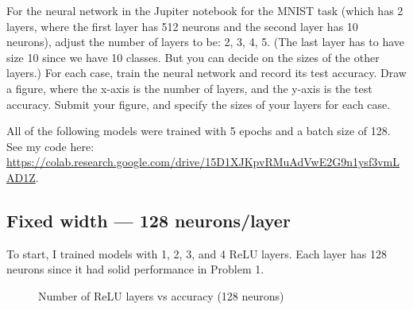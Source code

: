 \documentclass[11pt]{article}
\begin{document}
\pagebreak
\begin{homeworkProblem}
    \setcounter{section}{2}
    For the neural network in the Jupiter notebook for the MNIST task (which has 2 layers, where the first layer has 512 neurons and the second layer has 10 neurons), adjust
    the number of layers to be: 2, 3, 4, 5. (The last layer has to have size 10 since we have 10 classes. But you can decide on the sizes of the other layers.) For each case,
    train the neural network and record its test accuracy. Draw a figure, where the x-axis is the number of layers, and the y-axis is the test accuracy. Submit your figure,
    and specify the sizes of your layers for each case. \\

    \solution

    All of the following models were trained with 5 epochs and a batch size of 128. \\

    See my code here: \url{https://colab.research.google.com/drive/15D1XJKpvRMuAdVwE2G9n1ysf3vmLAD1Z}.

    \subsection{Fixed width — 128 neurons/layer}

    To start, I trained models with 1, 2, 3, and 4 ReLU layers. Each layer has 128 neurons since it had solid
    performance in Problem 1.

    \begin{figure}[h!]
        \centering
        \vspace{-0.1cm}
        \caption{Number of ReLU layers vs accuracy (128 neurons)}
        \label{figure:p21}
    \end{figure}


\end{homeworkProblem}
\end{document}
